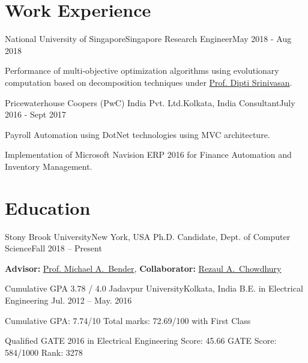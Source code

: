 \documentclass[letterpaper,10pt]{article}
\begin{document}
\section*{Work Experience}
\resumeSubHeadingListStart
\resumeSubheading 
{National University of Singapore}{Singapore}
{Research Engineer}{May 2018 - Aug 2018}
\resumeItemListStart
\item {Performance of multi-objective optimization algorithms using evolutionary computation based on decomposition techniques under \href{https://www.ece.nus.edu.sg/gems/profhome.html}{Prof. Dipti Srinivasan}.}
\resumeItemListEnd

\resumeSubheading
{Pricewaterhouse Coopers (PwC) India Pvt. Ltd.}{Kolkata, India}
{Consultant}{July 2016 - Sept 2017}
\resumeItemListStart
\item {Payroll Automation using DotNet technologies using MVC architecture.}
\item {Implementation of Microsoft Navision ERP 2016 for Finance Automation and Inventory Management.}
\resumeItemListEnd
\resumeSubHeadingListEnd

\section*{Education}
\resumeSubHeadingListStart
\resumeSubheading
{Stony Brook University}{New York, USA}
{Ph.D. Candidate, Dept. of Computer Science}{Fall 2018 -- Present}
\resumeItemListStart
\item \textbf{Advisor:} \href{https://www3.cs.stonybrook.edu/~bender/}{Prof. Michael A.\ Bender}, \textbf{Collaborator:} \href{https://www3.cs.stonybrook.edu/~rezaul/}{Rezaul A.\ Chowdhury}
\item Cumulative GPA 3.78 / 4.0
\resumeItemListEnd
\resumeSubheading
{Jadavpur University}{Kolkata, India}
{B.E. in Electrical Engineering }{Jul. 2012 -- May. 2016}
\resumeItemListStart
\item {Cumulative GPA: 7.74/10 Total marks: 72.69/100 with First Class}
\item {Qualified GATE 2016 in Electrical Engineering Score: 45.66 GATE Score: 584/1000 Rank: 3278}
\resumeItemListEnd
\resumeSubHeadingListEnd 


\end{document}
